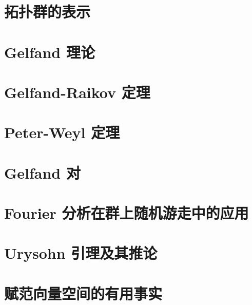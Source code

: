 \documentclass[geometry=a4, fontsetup=font-setup-open.tex, titlesetup=titles-setup, coverpage=cover, CJKthechapter=false]{AJbook}
\renewcommand{\thechapter}{\Roman{chapter}}
\begin{document}
\frontmatter        %

\mainmatter         %

\chapter[拓扑群的表示]{拓扑群的表示}


\chapter[Gelfand 理论]{Gelfand 理论}


\chapter[Gelfand-Raikov 定理]{Gelfand-Raikov 定理}


\chapter[Peter-Weyl 定理]{Peter-Weyl 定理}


\chapter[Gelfand 对]{Gelfand 对}


\chapter[Fourier 分析在群上随机游走中的应用]{Fourier 分析在群上随机游走中的应用}


\setcounter{chapter}{0}
\renewcommand{\thechapter}{\Alph{chapter}}
\chapter[Urysohn 引理及其推论]{Urysohn 引理及其推论}


\chapter[赋范向量空间的有用事实]{赋范向量空间的有用事实}




\printindex
\end{document}
